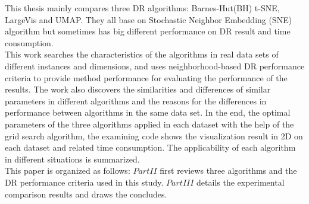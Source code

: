 
\noindent This thesis mainly compares three DR algorithms: Barnes-Hut(BH) t-SNE\cite{ref9}, LargeVis and UMAP. They all base on Stochastic Neighbor Embedding (SNE)\cite{ref15} algorithm but sometimes has big different performance on  DR result and time consumption.\\

\noindent This work searches the characteristics of the algorithms in real data sets of different instances and dimensions, and uses neighborhood-based DR performance criteria to provide method performance for evaluating the performance of the results\cite{ref4}. The work also discovers the similarities and differences of similar parameters in different algorithms and the reasons for the differences in performance between algorithms in the same data set. In the end, the optimal parameters of the three algorithms applied in each dataset with the help of the grid search algorithm, the examining code shows the visualization result in 2D on each dataset and related time consumption. The applicability of each algorithm in different situations is summarized.\\

\noindent This paper is organized as follows: $Part II$ first reviews three algorithms and the DR performance criteria used in this study. $Part III$ details the experimental comparison results and draws the concludes.


